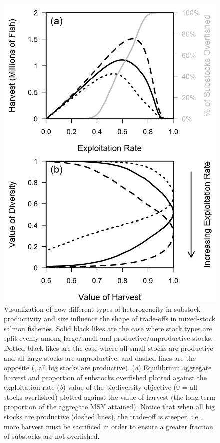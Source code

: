 \documentclass[12pt,]{book}
\theoremstyle{definition}
\theoremstyle{definition}
\theoremstyle{definition}
\theoremstyle{remark}
\begin{document}
\begin{figure}
  \centering
  \includegraphics{img/Ch4/trade-off-plot.png}
  \caption{Visualization of how different types of heterogeneity in substock productivity and size influence the shape of trade-offs in mixed-stock salmon fisheries. Solid black likes are the case where stock types are split evenly among large/small and productive/unproductive stocks. Dotted black likes are the case where all small stocks are productive and all large stocks are unproductive, and dashed lines are the opposite (, all big stocks are productive). (\textit{a}) Equilibrium aggregate harvest and proportion of substocks overfished plotted against the exploitation rate (\textit{b}) value of the biodiversity objective (0 = all stocks overfished) plotted against the value of harvest (the long term proportion of the aggregate MSY attained). Notice that when all big stocks are productive (dashed lines), the trade-off is steeper, i.e., more harvest must be sacrificed in order to ensure a greater fraction of substocks are not overfished. }
  \label{fig:trade-off-plot}
\end{figure}
\end{document}
